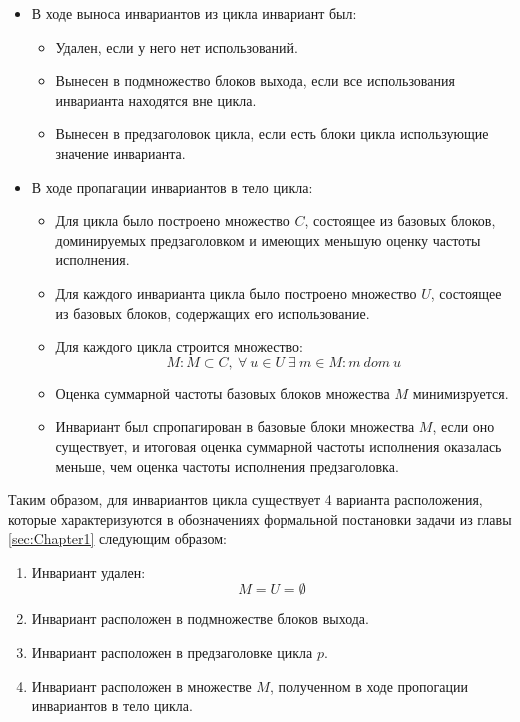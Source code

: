 \begin{itemize}
    \item В ходе выноса инвариантов из цикла инвариант был:
        \begin{itemize}
            \item Удален, если у него нет использований.
            \item Вынесен в подмножество блоков выхода, если все использования инварианта находятся вне цикла.
            \item Вынесен в предзаголовок цикла, если есть блоки цикла использующие значение инварианта.
        \end{itemize}
    \item В ходе пропагации инвариантов в тело цикла:
        \begin{itemize}
            \item Для цикла было построено множество $C$, состоящее из базовых блоков, доминируемых предзаголовком и имеющих меньшую оценку частоты исполнения.
            \item Для каждого инварианта цикла было построено множество $U$, состоящее из базовых блоков, содержащих его использование.
            \item Для каждого цикла строится множество:
                $$ M : M \subset C, \: \forall \: u \in U \: \exists \: m \in M : m \: dom \: u $$
            \item Оценка суммарной частоты базовых блоков множества $M$ минимизруется. 
            \item Инвариант был спропагирован в базовые блоки множества $M$, если оно существует, и итоговая оценка суммарной частоты исполнения оказалась меньше, чем оценка частоты исполнения предзаголовка.
        \end{itemize}
\end{itemize}

Таким образом, для инвариантов цикла существует 4 варианта расположения, которые характеризуются в обозначениях формальной постановки задачи из главы \ref{sec:Chapter1} следующим образом:
\begin{enumerate}
    \item Инвариант удален:
        $$ M = U = \emptyset $$
    \item Инвариант расположен в подмножестве блоков выхода.
    \item Инвариант расположен в предзаголовке цикла $p$.
    \item Инвариант расположен в множестве $M$, полученном в ходе пропогации инвариантов в тело цикла.
\end{enumerate}

